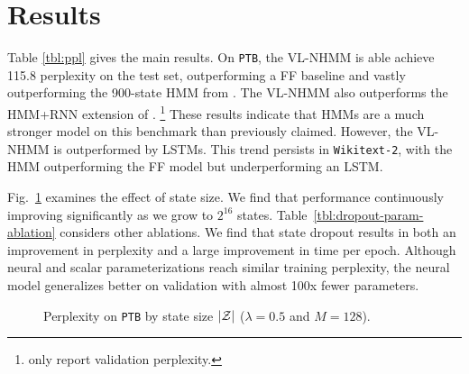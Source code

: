 \documentclass[11pt,a4paper]{article}
\begin{document}
\section{Results}
Table \ref{tbl:ppl} gives the main results.
On \texttt{PTB}, the VL-NHMM is able achieve 115.8 perplexity on the test set,
outperforming a FF baseline
and vastly outperforming the 900-state HMM from \citet{buys2018hmm}.
The VL-NHMM also outperforms the HMM+RNN extension of \citet{buys2018hmm}.
\footnote{\citet{buys2018hmm} only report validation perplexity.}
These results indicate that HMMs are a much stronger model on this benchmark than previously claimed.
However, the VL-NHMM is outperformed by LSTMs.
This trend persists in \texttt{Wikitext-2},
with the HMM outperforming the FF model but underperforming an LSTM.

Fig.~\ref{tbl:states-ablation} examines the effect of state size.
We find that performance continuously improving significantly as we grow to $2^{16}$ states.
Table~\ref{tbl:dropout-param-ablation} considers other ablations.
We find that state dropout results in both an improvement in perplexity and
a large improvement in time per epoch.
Although neural and scalar parameterizations reach similar training perplexity,
the neural model generalizes better on validation
with almost 100x fewer parameters.

\begin{figure}[!t]
\centering
{}
\caption{\label{tbl:states-ablation}
Perplexity on \texttt{PTB} by state size $|\mathcal{Z}|$ ($\lambda =0.5$ and $M=128$).
}
\end{figure}
\end{document}
